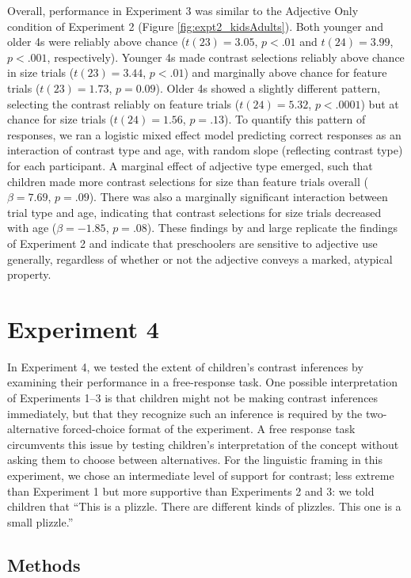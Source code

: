 \documentclass[man]{apa2}
\begin{document}
Overall, performance in Experiment 3 was similar to the Adjective Only condition of Experiment 2 (Figure \ref{fig:expt2_kidsAdults}). 
Both younger and older 4s were reliably above chance ($t(23) = 3.05$, $p<.01$ and $t(24) = 3.99$, $p<.001$, respectively). Younger 4s made contrast selections reliably above chance in size trials ($t(23)=3.44$, $p<.01$) and marginally above chance for feature trials ($t(23)=1.73$, $p=0.09$). Older 4s showed a slightly different pattern, selecting the contrast reliably on feature trials ($t(24)=5.32$, $p<.0001$) but at chance for size trials ($t(24)=1.56$, $p=.13$). To quantify this pattern of responses, we ran a logistic mixed effect model predicting correct responses as an interaction of contrast type and age, with random slope (reflecting contrast type) for each participant.  A marginal effect of adjective type emerged, such that children made more contrast selections for size than feature trials overall ($\beta = 7.69$, $p = .09$). There was also a marginally significant interaction between trial type and age, indicating that contrast selections for size trials decreased with age ($\beta = -1.85$, $p = .08$). These findings by and large replicate the findings of Experiment 2 and indicate that preschoolers are sensitive to adjective use generally, regardless of whether or not the adjective conveys a marked, atypical property.

\section{Experiment 4} 

In Experiment 4, we tested the extent of children's contrast inferences by examining their performance in a free-response task. One possible interpretation of Experiments 1--3 is that children might not be making  contrast inferences immediately, but that they recognize such an inference is required by the two-alternative forced-choice format of the experiment. A free response task circumvents this issue by testing children's interpretation of the concept without asking them to choose between alternatives. For the linguistic framing in this experiment, we chose an intermediate level of support for contrast; less extreme than Experiment 1 but more supportive than Experiments 2 and 3: we told children that ``This is a plizzle. There are different kinds of plizzles. This one is a small plizzle.'' 

\subsection{Methods}
\end{document}

